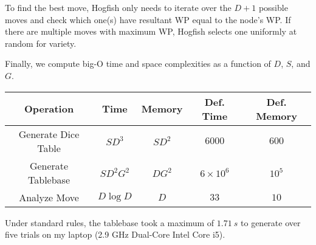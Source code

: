 \documentclass[12 pt]{article}
\begin{document}
		To find the best move, Hogfish only needs to iterate over the $D + 1$ possible moves and check which one(s) have resultant WP equal to the node's WP. If there are multiple moves with maximum WP, Hogfish selects one uniformly at random for variety.

		Finally, we compute big-O time and space complexities as a function of $D$, $S$, and $G$.

		\begin{center}
			\begin{tabular}{|*{5}{c|}}
				\hline
				Operation & Time & Memory & Def. Time & Def. Memory \\
				\hline
				Generate Dice Table & $SD^3$ & $SD^2$ & $6000$ & $600$ \\
				Generate Tablebase & $SD^2G^2$ & $DG^2$ & $6 \times 10^6$ & $10^5$ \\
				Analyze Move & $D\log D$ & $D$ & $33$ & $10$ \\
				\hline
			\end{tabular}
		\end{center}

		Under standard rules, the tablebase took a maximum of $\SI{1.71}{s}$ to generate over five trials on my laptop (2.9 GHz Dual-Core Intel Core i5).
\end{document}
